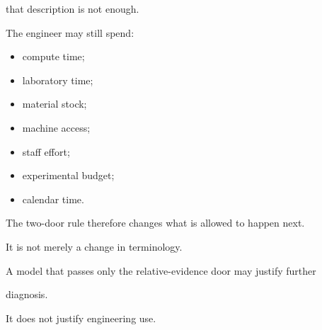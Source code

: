 \documentclass[11pt,a4paper,oneside]{report}
\begin{document}
that description is not enough.



The engineer may still spend:



\begin{itemize}



\item

compute time;



\item

laboratory time;



\item

material stock;



\item

machine access;



\item

staff effort;



\item

experimental budget;



\item

calendar time.



\end{itemize}



The two-door rule therefore changes what is allowed to happen next.



It is not merely a change in terminology.





\begin{engineeringconsequence}



A model that passes only the relative-evidence door may justify further

diagnosis.



It does not justify engineering use.



\end{engineeringconsequence}
\end{document}
